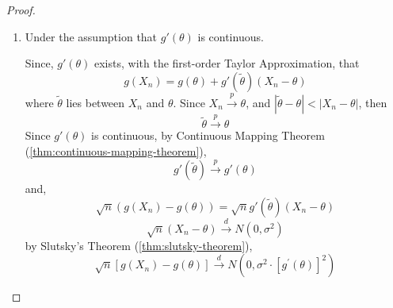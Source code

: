 \begin{proof}
	\begin{enumerate}
		\item  Under the assumption that $g'(\theta)$ is continuous.

		      Since, $g'(\theta)$ exists, with the first-order Taylor Approximation, that
		      \begin{equation*}
			      g(X_n)=g(\theta)+g'(\tilde{\theta})(X_n-\theta)
		      \end{equation*}
		      where $\tilde{\theta}$ lies between $X_n$ and $\theta$.
		      Since $X_n\stackrel{p}{\rightarrow}\theta$, and $|\tilde{\theta}-\theta|<|X_n-\theta|$, then
		      \begin{equation*}
			      \tilde{\theta}\stackrel{p}{\rightarrow}\theta
		      \end{equation*}
		      Since $g'(\theta)$ is continuous, by Continuous Mapping Theorem (\ref{thm:continuous-mapping-theorem}),
		      \begin{equation*}
			      g'(\tilde{\theta})\stackrel{p}{\rightarrow}g'(\theta)
		      \end{equation*}
		      and,
		      \begin{equation*}
			      \sqrt{n}\left(g(X_n)-g(\theta)\right)=\sqrt{n}g'(\tilde{\theta})(X_n-\theta)
		      \end{equation*}
		      \begin{equation*}
			      \sqrt{n}\left(X_{n}-\theta\right)\stackrel{d}{\rightarrow}N\left(0,\sigma^{2}\right)
		      \end{equation*}
		      by Slutsky's Theorem (\ref{thm:slutsky-theorem}),
		      \begin{equation*}
			      \sqrt{n}\left[g\left(X_{n}\right)-g(\theta)\right] \stackrel{d}{\rightarrow}N\left(0,\sigma^{2}\cdot\left[g^{\prime}(\theta)\right]^{2}\right)
		      \end{equation*}
	\end{enumerate}
\end{proof}

\begin{theorem}

\end{theorem}

